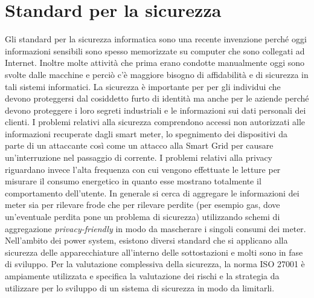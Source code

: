\section{Standard per la sicurezza}
Gli standard per la sicurezza informatica sono una recente invenzione perché oggi informazioni sensibili sono spesso memorizzate su computer che sono collegati ad Internet. Inoltre molte attività che prima erano condotte manualmente oggi sono svolte dalle macchine e perciò c'è maggiore bisogno di affidabilità e di sicurezza in tali sistemi informatici. La sicurezza è importante per per gli individui che devono proteggersi dal cosiddetto furto di identità ma anche per le aziende perché devono proteggere i loro segreti industriali e le informazioni sui dati personali dei clienti. 
I problemi relativi alla sicurezza comprendono accessi non autorizzati alle informazioni recuperate dagli smart meter, lo spegnimento dei dispositivi da parte di un attaccante così come un attacco alla Smart Grid per causare un'interruzione nel passaggio di corrente. I problemi relativi alla privacy riguardano invece l’alta frequenza con cui vengono effettuate le letture per misurare il consumo energetico in quanto esse mostrano totalmente il comportamento dell’utente. In generale si cerca di aggregare le informazioni dei meter sia per rilevare frode che per rilevare perdite (per esempio gas, dove un'eventuale perdita pone un problema di sicurezza) utilizzando schemi di aggregazione \emph{privacy-friendly} in modo da mascherare i singoli consumi dei meter.
Nell'ambito dei power system, esistono diversi standard che si applicano alla sicurezza delle apparecchiature all'interno delle sottostazioni e molti sono in fase di sviluppo. Per la valutazione complessiva della sicurezza, la norma ISO 27001 è ampiamente utilizzata e specifica la valutazione dei rischi e la strategia da utilizzare per lo sviluppo di un sistema di sicurezza in modo da limitarli.
